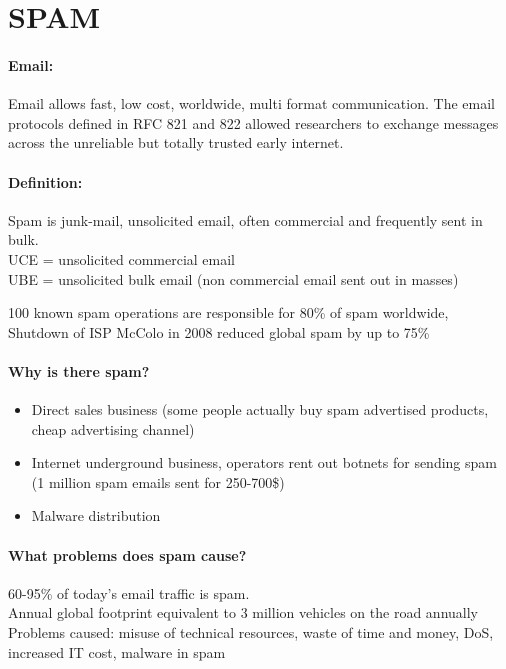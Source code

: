 \section{SPAM}

\paragraph{Email:} Email allows fast, low cost, worldwide, multi format communication. The email protocols defined in RFC 821 and 822 allowed researchers to exchange messages across the unreliable but totally trusted early internet.

\paragraph{Definition:} Spam is junk-mail, unsolicited email, often commercial and frequently sent in bulk.\\
UCE = unsolicited commercial email \\
UBE = unsolicited bulk email (non commercial email sent out in masses)

100 known spam operations are responsible for 80\% of spam worldwide, Shutdown of ISP McColo in 2008 reduced global spam by up to 75\%

\paragraph{Why is there spam?}
\begin{itemize}
\item Direct sales business (some people actually buy spam advertised products, cheap advertising channel)
\item Internet underground business, operators rent out botnets for sending spam (1 million spam emails sent for 250-700\$)
\item Malware distribution
\end{itemize}

\paragraph{What problems does spam cause?} 60-95\% of today's email traffic is spam. \\
Annual global footprint equivalent to 3 million vehicles on the road annually \\
Problems caused: misuse of technical resources, waste of time and money, DoS, increased IT cost, malware in spam

